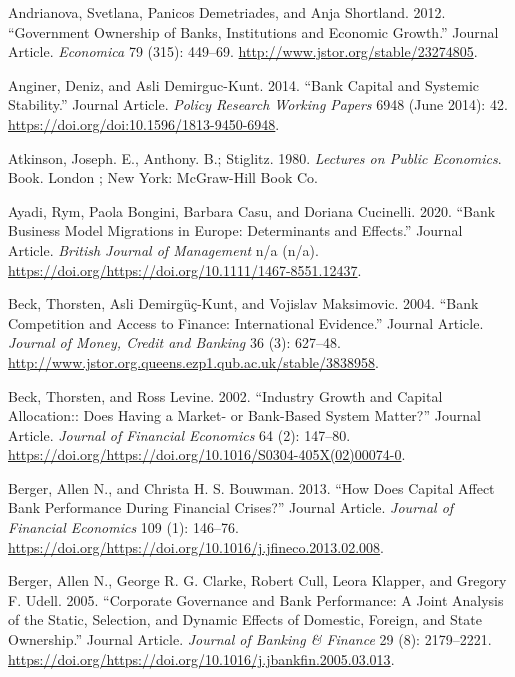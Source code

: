 \documentclass{article}
\begin{document}
\leavevmode\hypertarget{ref-RN17}{}%
Andrianova, Svetlana, Panicos Demetriades, and Anja Shortland. 2012.
``Government Ownership of Banks, Institutions and Economic Growth.''
Journal Article. \emph{Economica} 79 (315): 449--69.
\url{http://www.jstor.org/stable/23274805}.

\leavevmode\hypertarget{ref-RN18}{}%
Anginer, Deniz, and Asli Demirguc-Kunt. 2014. ``Bank Capital and
Systemic Stability.'' Journal Article. \emph{Policy Research Working
Papers} 6948 (June 2014): 42.
\url{https://doi.org/doi:10.1596/1813-9450-6948}.

\leavevmode\hypertarget{ref-RN20}{}%
Atkinson, Joseph. E., Anthony. B.; Stiglitz. 1980. \emph{Lectures on
Public Economics}. Book. London ; New York: McGraw-Hill Book Co.

\leavevmode\hypertarget{ref-RN21}{}%
Ayadi, Rym, Paola Bongini, Barbara Casu, and Doriana Cucinelli. 2020.
``Bank Business Model Migrations in Europe: Determinants and Effects.''
Journal Article. \emph{British Journal of Management} n/a (n/a).
\url{https://doi.org/https://doi.org/10.1111/1467-8551.12437}.

\leavevmode\hypertarget{ref-RN22}{}%
Beck, Thorsten, Asli Demirgüç-Kunt, and Vojislav Maksimovic. 2004.
``Bank Competition and Access to Finance: International Evidence.''
Journal Article. \emph{Journal of Money, Credit and Banking} 36 (3):
627--48.
\url{http://www.jstor.org.queens.ezp1.qub.ac.uk/stable/3838958}.

\leavevmode\hypertarget{ref-RN23}{}%
Beck, Thorsten, and Ross Levine. 2002. ``Industry Growth and Capital
Allocation:: Does Having a Market- or Bank-Based System Matter?''
Journal Article. \emph{Journal of Financial Economics} 64 (2): 147--80.
\url{https://doi.org/https://doi.org/10.1016/S0304-405X(02)00074-0}.

\leavevmode\hypertarget{ref-RN24}{}%
Berger, Allen N., and Christa H. S. Bouwman. 2013. ``How Does Capital
Affect Bank Performance During Financial Crises?'' Journal Article.
\emph{Journal of Financial Economics} 109 (1): 146--76.
\url{https://doi.org/https://doi.org/10.1016/j.jfineco.2013.02.008}.

\leavevmode\hypertarget{ref-RN25}{}%
Berger, Allen N., George R. G. Clarke, Robert Cull, Leora Klapper, and
Gregory F. Udell. 2005. ``Corporate Governance and Bank Performance: A
Joint Analysis of the Static, Selection, and Dynamic Effects of
Domestic, Foreign, and State Ownership.'' Journal Article. \emph{Journal
of Banking \& Finance} 29 (8): 2179--2221.
\url{https://doi.org/https://doi.org/10.1016/j.jbankfin.2005.03.013}.
\end{document}
